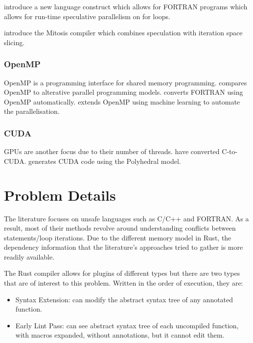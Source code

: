 \documentclass[conference]{IEEEtran}
\begin{document}
\textcite{Rauchwerger1999} introduce a new language construct which allows for FORTRAN programs which allows for run-time speculative parallelism on for loops.

\textcite{Quinones2005} introduce the Mitosis compiler which combines speculation with iteration space slicing.

\subsubsection{OpenMP}
OpenMP is a programming interface for shared memory programming.
\textcite{Dagum1998} compares OpenMP to alterative parallel programming models.
\textcite{Kim2000} converts FORTRAN using OpenMP automatically.
\textcite{Lam2011} extends OpenMP using machine learning to automate the parallelisation.

\subsubsection{CUDA}
GPUs are another focus due to their number of threads.
\textcite{Baskaran2010} have converted C-to-CUDA.
\textcite{Verdoolaege2013} generates CUDA code using the Polyhedral model.

\section{Problem Details}
\label{sec:problem-details}

The literature focuses on unsafe languages such as C/C++ and FORTRAN. As a result, most of their methods revolve around understanding conflicts between statements/loop iterations. Due to the different memory model in Rust, the dependency information that the literature's approaches tried to gather is more readily available.

The Rust compiler allows for plugins of different types but there are two types that are of interest to this problem. Written in the order of execution, they are:
\begin{itemize}
    \item Syntax Extension: can modify the abstract syntax tree of any annotated function.
    \item Early Lint Pass: can see abstract syntax tree of each uncompiled function, with macros expanded, without annotations, but it cannot edit them.
\end{itemize}
\end{document}
